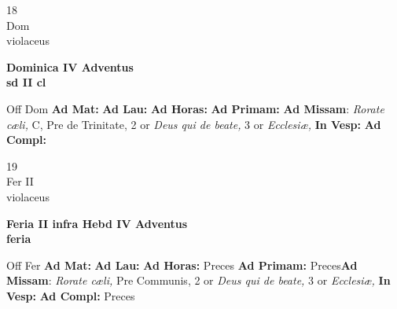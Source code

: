 \documentclass[10pt, openany]{book}
\begin{document}
    \begin{center}
        \begin{minipage}{3.5in}
            \vspace{2em}
            \begin{minipage}{0.5in}
                {\Huge 18} \\
                {\normalsize Dom} \\
                {\normalsize violaceus}
            \end{minipage}
            \begin{minipage}{3.0in}
                \textbf{ \large Dominica IV Adventus \\
                \textnormal{\normalsize sd II cl}} \\ 
            \end{minipage}
            \begin{justify}Off Dom
                \textbf{Ad Mat: }
                \textbf{Ad Lau: }
                \textbf{Ad Horas: }
                \textbf{Ad Primam: }\textbf{Ad Missam}: \textit{Rorate cæli,} C, Pre de Trinitate, 2 or \textit{Deus qui de beate,} 3 or \textit{Ecclesiæ,}  
                \textbf{In Vesp: }
                \textbf{Ad Compl: }
            \end{justify}
        \end{minipage}
    \end{center}

    \begin{center}
        \begin{minipage}{3.5in}
            \vspace{2em}
            \begin{minipage}{0.5in}
                {\Huge 19} \\
                {\normalsize Fer II} \\
                {\normalsize violaceus}
            \end{minipage}
            \begin{minipage}{3.0in}
                \textbf{ \large Feria II infra Hebd IV Adventus \\
                \textnormal{\normalsize feria}} \\ 
            \end{minipage}
            \begin{justify}Off Fer
                \textbf{Ad Mat: }
                \textbf{Ad Lau: }
                \textbf{Ad Horas: }Preces
                \textbf{Ad Primam: }Preces\textbf{Ad Missam}: \textit{Rorate cæli,} Pre Communis, 2 or \textit{Deus qui de beate,} 3 or \textit{Ecclesiæ,}  
                \textbf{In Vesp: }
                \textbf{Ad Compl: }Preces
            \end{justify}
        \end{minipage}
    \end{center}
\end{document}

